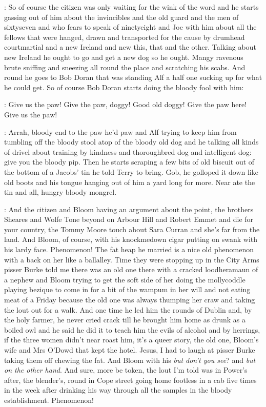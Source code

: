 \Nq:
So of course the citizen was only waiting for the wink of the word and
he starts gassing out of him about the invincibles and the old guard and
the men of sixtyseven and who fears to speak of ninetyeight and Joe with
him about all the fellows that were hanged, drawn and transported for the
cause by drumhead courtmartial and a new Ireland and new this, that and
the other. Talking about new Ireland he ought to go and get a new dog so
he ought. Mangy ravenous brute sniffing and sneezing all round the place
and scratching his scabs. And round he goes to Bob Doran that was
standing Alf a half one sucking up for what he could get. So of course Bob
Doran starts doing the bloody fool with him:

\doran:
Give us the paw! Give the paw, doggy! Good old doggy! Give the paw
here! Give us the paw!

\Nq:
Arrah, bloody end to the paw he'd paw and Alf trying to keep him
from tumbling off the bloody stool atop of the bloody old dog and he
talking all kinds of drivel about training by kindness and thoroughbred
dog and intelligent dog: give you the bloody pip. Then he starts scraping
a few bits of old biscuit out of the bottom of a Jacobs' tin he told Terry
to bring. Gob, he golloped it down like old boots and his tongue hanging
out of him a yard long for more. Near ate the tin and all, hungry bloody
mongrel.

\Nq:
And the citizen and Bloom having an argument about the point, the
brothers Sheares and Wolfe Tone beyond on Arbour Hill and Robert
Emmet and die for your country, the Tommy Moore touch about Sara
Curran and she's far from the land. And Bloom, of course, with his
knockmedown cigar putting on swank with his lardy face. Phenomenon!
The fat heap he married is a nice old phenomenon with a back on her like a
ballalley. Time they were stopping up in the City Arms pisser Burke told
me there was an old one there with a cracked loodheramaun of a nephew and
Bloom trying to get the soft side of her doing the mollycoddle playing
bezique to come in for a bit of the wampum in her will and not eating meat
of a Friday because the old one was always thumping her craw and taking
the lout out for a walk. And one time he led him the rounds of Dublin and,
by the holy farmer, he never cried crack till he brought him home as drunk
as a boiled owl and he said he did it to teach him the evils of alcohol
and by herrings, if the three women didn't near roast him, it's a queer
story, the old one, Bloom's wife and Mrs O'Dowd that kept the hotel.
Jesus, I had to laugh at pisser Burke taking them off chewing the fat.
And Bloom with his \emph{but don't you see}? and
\emph{but on the other hand}. And sure,
more be token, the lout I'm told was in Power's after, the blender's,
round in Cope street going home footless in a cab five times in the week
after drinking his way through all the samples in the bloody
establishment. Phenomenon!

